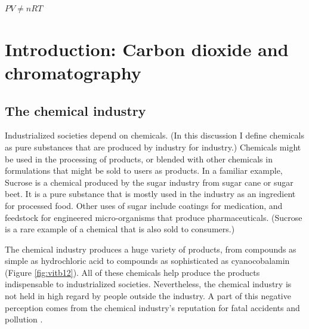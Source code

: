 
\begin{savequote}[\quotewidth]
$PV \ne nRT$
\end{savequote}

\chapter{Introduction: Carbon dioxide and chromatography} %

\label{Chapter2} %



\section{The chemical industry}

Industrialized societies depend on chemicals. (In this discussion I define
chemicals as pure substances that are produced by industry for industry.)
Chemicals might be used in the processing of products, or blended with other
chemicals in formulations that might be sold to users as products. In a familiar
example, Sucrose is a chemical produced by the sugar industry from sugar cane or
sugar beet. It is a pure substance that is mostly used in the industry
as an ingredient for processed food. Other uses of sugar include coatings for
medication, and feedstock for engineered micro-organisms that produce
pharmaceuticals. (Sucrose is a rare example of a chemical that is also sold to
consumers.)
 
The chemical industry produces a huge variety of products, from compounds as
simple as hydrochloric acid to compounds as sophisticated as cyanocobalamin
(Figure \ref{fig:vitb12}). All of these chemicals help produce the products
indispensable to industrialized societies. Nevertheless, the chemical industry
is not held in high regard by people outside the industry. A part of this
negative perception comes from the chemical industry's reputation for fatal
accidents and pollution \autocite{Gumm2015}.

